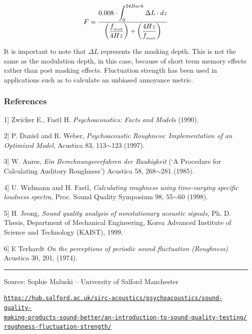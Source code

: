 \[ F = {0.008 \cdot \displaystyle \int_0^{24Bark} \Delta L \cdot dz \over \displaystyle \left({f_{_{mod}} \over 4Hz}\right) + \displaystyle \left({4Hz \over f_{_{mod}}}\right) } \]

It is important to note that $\Delta L$ represents the masking depth.
This is not the same as the modulation depth, in this case, because of
short term memory effects rather than post masking effects. Fluctuation
strength has been used in applications such as to calculate an unbiased
annoyance metric.

\subsubsection*{References}\label{references}

{\small 
\noindent {[}1{]} Zwicker E., Fastl H. \textit{Psychoacoustics: Facts and Models} (1990).

\noindent {[}2{]} P. Daniel and R. Weber, \textit{Psychoacoustic Roughness:
Implementation of an Optimized Model}, Acustica 83, 113$\sim$123 (1997).

\noindent {[}3{]} W. Aures, \textit{Ein Berechnungsverfahren der Rauhigkeit} (`A
Procedure for Calculating Auditory Roughness') Acustica 58, 268$\sim$281 (1985).

\noindent {[}4{]} U. Widmann and H. Fastl, \textit{Calculating roughness using
time-varying specific loudness spectra}, Proc. Sound Quality Symposium 98, 55$\sim$60 (1998).

\noindent {[}5{]} H. Jeong, \textit{Sound quality analysis of nonstationary acoustic
signals}, Ph. D. Thesis, Department of Mechanical Engineering, Korea
Advanced Institute of Science and Technology (KAIST), 1999.

\noindent {[}6{]} E Terhardt \textit{On the perceptions of periodic sound fluctuation
(Roughness)} Acustica 30, 201, (1974).
}

\begin{center}\rule{0.5\linewidth}{0.5pt}\end{center}


Source:  Sophie Maluski -- University of Salford Manchester 

\href{https://hub.salford.ac.uk/sirc-acoustics/psychoacoustics/sound-quality-making-products-sound-better/an-introduction-to-sound-quality-testing/roughness-fluctuation-strength/}{\texttt{\small https://hub.salford.ac.uk/sirc-acoustics/psychoacoustics/sound-quality-\\ \indent making-products-sound-better/an-introduction-to-sound-quality-testing/\\ \indent roughness-fluctuation-strength/}}
%

